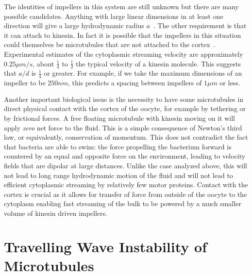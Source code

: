 \documentclass[pre,showpacs]{revtex4}
\begin{document}
The identities of impellers in this system are still unknown but there are many possible
candidates. Anything with  large linear dimensions in at least one direction 
will give a large hydrodynamic radius $a$~\cite{BergRandomWalksinBiology}. The
other requirement is that it can attach to kinesin.  In fact
it is possible that the impellers in this situation could themselves be microtubules that are
not attached to the cortex~\cite{WangRiechmann,Seeger}.
Experimental estimates of the cytoplasmic streaming velocity
are approximately $0.25 \mu m/s$, about $\frac{1}{4}$ to $\frac{1}{2}$ the typical velocity of a kinesin
molecule. This suggests that $a/d$ is $\frac{1}{4}$ or greater.
For example, if we take the maximum dimensions of an impeller to be $250 nm$,
this predicts a spacing between impellers of $1 \mu m$ or less.

Another important biological issue is the necessity to have some microtubules in direct physical contact
with the cortex of the
oocyte, for example by tethering or by frictional forces. A free floating microtubule with kinesin moving on it will apply {\em zero} net force
to the fluid. This is a simple consequence of Newton's third law, or equivalently, conservation
of momentum. This does not contradict
the fact that bacteria are able to swim: the force propelling the bacterium forward is
countered by an equal and opposite force on the environment, leading to velocity fields that
are dipolar at large distances. Unlike the case analyzed above, this will not lead to long range hydrodynamic motion
of the fluid and will not lead to efficient cytoplasmic streaming by relatively few motor proteins. 
Contact with the cortex is crucial as it allows for transfer of force from outside of
the oocyte to the cytoplasm enabling fast streaming of the bulk to be powered by a much smaller volume of kinesin driven
impellers.

\section{Travelling Wave Instability of Microtubules}
\end{document}
